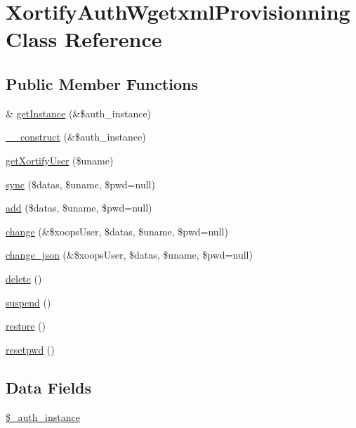 \hypertarget{class_xortify_auth_wgetxml_provisionning}{\section{Xortify\-Auth\-Wgetxml\-Provisionning Class Reference}
\label{class_xortify_auth_wgetxml_provisionning}
}
\subsection*{Public Member Functions}
\begin{DoxyCompactItemize}
\item 
\& \hyperlink{class_xortify_auth_wgetxml_provisionning_a2c8eaa915c70d75289ac8a03686194f9}{get\-Instance} (\&\$auth\-\_\-instance)
\item 
\hyperlink{class_xortify_auth_wgetxml_provisionning_a0f25832dc86774e7605b81fe57b083c2}{\-\_\-\-\_\-construct} (\&\$auth\-\_\-instance)
\item 
\hyperlink{class_xortify_auth_wgetxml_provisionning_a041d726ac26672547ed1504e8e0117aa}{get\-Xortify\-User} (\$uname)
\item 
\hyperlink{class_xortify_auth_wgetxml_provisionning_a35dc08b0f2138eb818ff95345b73bcff}{sync} (\$datas, \$uname, \$pwd=null)
\item 
\hyperlink{class_xortify_auth_wgetxml_provisionning_adfc9fcef01e7bd7b2f47e8e79d51fc63}{add} (\$datas, \$uname, \$pwd=null)
\item 
\hyperlink{class_xortify_auth_wgetxml_provisionning_ae1f0971b9712c794620cf309164e43af}{change} (\&\$xoops\-User, \$datas, \$uname, \$pwd=null)
\item 
\hyperlink{class_xortify_auth_wgetxml_provisionning_a94f4e0408f26e65abca347ec883f4ec9}{change\-\_\-json} (\&\$xoops\-User, \$datas, \$uname, \$pwd=null)
\item 
\hyperlink{class_xortify_auth_wgetxml_provisionning_a13bdffdd926f26b825ea57066334ff01}{delete} ()
\item 
\hyperlink{class_xortify_auth_wgetxml_provisionning_ad73006a505121228f3b075c2409787d2}{suspend} ()
\item 
\hyperlink{class_xortify_auth_wgetxml_provisionning_aa1371f22826cf8cde4454c9b467203d0}{restore} ()
\item 
\hyperlink{class_xortify_auth_wgetxml_provisionning_a06d70fbd3a2db390b6f2530c0076628e}{resetpwd} ()
\end{DoxyCompactItemize}
\subsection*{Data Fields}
\begin{DoxyCompactItemize}
\item 
\hyperlink{class_xortify_auth_wgetxml_provisionning_a486ed878bb5a7188c99ac4c9ee46ac6e}{\$\-\_\-auth\-\_\-instance}
\end{DoxyCompactItemize}


